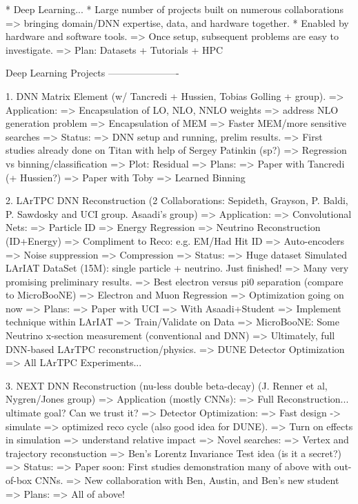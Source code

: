 * Deep Learning... 
   * Large number of projects built on numerous collaborations
      => bringing domain/DNN expertise, data, and hardware together.
   * Enabled by hardware and software tools.
      => Once setup, subsequent problems are easy to investigate.
   => Plan: Datasets + Tutorials + HPC 

Deep Learning Projects
----------------------

1. DNN Matrix Element (w/ Tancredi + Hussien, Tobias Golling + group). 
   => Application: 
      => Encapsulation of LO, NLO, NNLO weights => address NLO generation problem
      => Encapsulation of MEM => Faster MEM/more sensitive searches
   => Status: 
      => DNN setup and running, prelim results.
      => First studies already done on Titan with help of Sergey Patinkin (sp?)
         => Regression vs binning/classification
      => Plot: Residual
   => Plans: 
      => Paper with Tancredi (+ Hussien?)
      => Paper with Toby
         => Learned Binning

2. LArTPC DNN Reconstruction (2 Collaborations: Sepideth, Grayson, P. Baldi, P. Sawdosky and UCI group. Asaadi's group)
   => Application:
      => Convolutional Nets:
         => Particle ID
         => Energy Regression
            => Neutrino Reconstruction (ID+Energy)
         => Compliment to Reco: e.g. EM/Had Hit ID
      => Auto-encoders
         => Noise suppression 
         => Compression
   => Status:
      => Huge dataset Simulated LArIAT DataSet (15M): single particle + neutrino. Just finished!
      => Many very promising preliminary results.
         => Best electron versus pi0 separation (compare to MicroBooNE)
         => Electron and Muon Regression
      => Optimization going on now
   => Plans:
      => Paper with UCI 
      => With Asaadi+Student
         => Implement technique within LArIAT
         => Train/Validate on Data 
            => MicroBooNE: Some Neutrino x-section measurement (conventional and DNN)
      => Ultimately, full DNN-based LArTPC reconstruction/physics.
         => DUNE Detector Optimization
         => All LArTPC Experiments...

3. NEXT DNN Reconstruction (nu-less double beta-decay) (J. Renner et al, Nygren/Jones group)
   => Application (mostly CNNs):
      => Full Reconstruction... ultimate goal? Can we trust it?
      => Detector Optimization:
         => Fast design -> simulate => optimized reco cycle (also good idea for DUNE).
         => Turn on effects in simulation => understand relative impact
      => Novel searches:
         => Vertex and trajectory reconstuction 
            => Ben's Lorentz Invariance Test idea (is it a secret?)
   => Status:
      => Paper soon: First studies demonstration many of above with out-of-box CNNs. 
      => New collaboration with Ben, Austin, and Ben's new student
   => Plans:
      => All of above!

